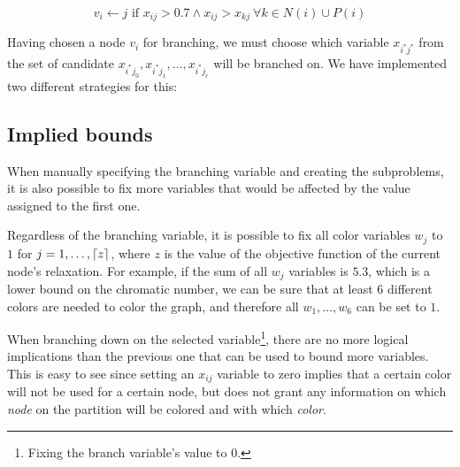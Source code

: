 \begin{equation}
\label{eqn:fixcriteria}
v_i \leftarrow j \text{ if } x_{ij} > 0.7 \wedge x_{ij} > x_{kj}\ \forall k \in N(i) \cup P(i)
\end{equation}

Having chosen a node $v_i$ for branching, we must choose which variable $x_{i^*j^*}$ from the set of candidate $x_{i^*j_0}, x_{i^*j_1}, \ldots, x_{i^*j_c}$ will be branched on. We have implemented two different strategies for this:
\begin{itemize}
\end{itemize}

\subsection{Implied bounds}
\label{subsubsec:alg:branch:bounds}

When manually specifying the branching variable and creating the subproblems, it is also possible to fix more variables that would be affected by the value assigned to the first one.

Regardless of the branching variable, it is possible to fix all color variables $w_j$ to $1$ for $j = 1,\ldots,\left\lceil z \right\rceil$, where $z$ is the value of the objective function of the current node's relaxation. For example, if the sum of all $w_j$ variables is $5.3$, which is a lower bound on the chromatic number, we can be sure that at least $6$ different colors are needed to color the graph, and therefore all $w_1,\ldots,w_6$ can be set to $1$.

When branching down on the selected variable\footnote{Fixing the branch variable's value to 0.}, there are no more logical implications than the previous one that can be used to bound more variables. This is easy to see since setting an $x_{ij}$ variable to zero implies that a certain color will not be used for a certain node, but does not grant any information on which \textit{node} on the partition will be colored and with which \textit{color}.

